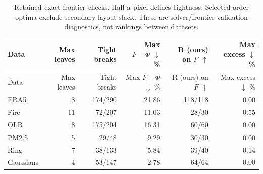 \begingroup\small\setlength{\tabcolsep}{4pt}
\begin{longtable}{lrrrrr}
\caption{Retained exact-frontier checks. Half a pixel defines tightness. Selected-order optima exclude secondary-layout slack. These are solver/frontier validation diagnostics, not rankings between datasets.}\\\toprule
Data & Max leaves & Tight breaks & Max $F-\Phi$ $\downarrow$ \% & R (ours) on $F$ $\uparrow$ & Max excess $\downarrow$ \%\\\midrule\endfirsthead
\toprule Data & Max leaves & Tight breaks & Max $F-\Phi$ $\downarrow$ \% & R (ours) on $F$ $\uparrow$ & Max excess $\downarrow$ \%\\\midrule\endhead
\bottomrule\endfoot
ERA5 & 8 & 174/290 & 21.86 & 118/118 & 0.00\\
Fire & 11 & 72/207 & 11.03 & 28/30 & 0.55\\
OLR & 8 & 175/204 & 16.31 & 60/60 & 0.00\\
PM2.5 & 5 & 29/48 & 9.29 & 30/30 & 0.00\\
Ring & 7 & 38/133 & 5.84 & 39/40 & 0.14\\
Gaussians & 4 & 53/147 & 2.78 & 64/64 & 0.00\\
\end{longtable}\endgroup

